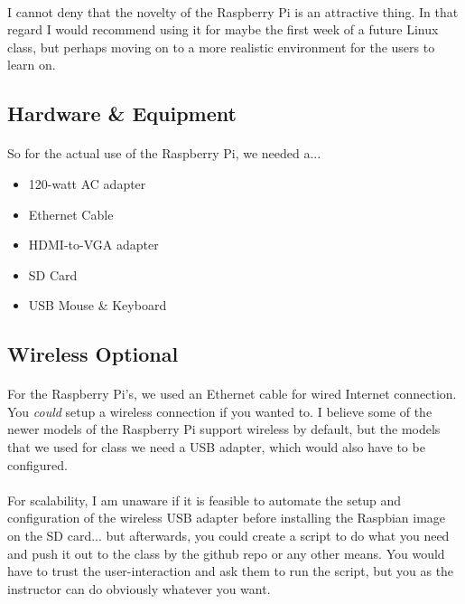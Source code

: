 \documentclass[11pt]{article}
\begin{document}
	\paragraph{} I cannot deny that the novelty of the Raspberry Pi is an attractive thing. In that regard I would recommend using it for maybe the first week of a future Linux class, but perhaps moving on to a more realistic environment for the users to learn on. 

	\subsection{Hardware \& Equipment}

	\paragraph{} So for the actual use of the Raspberry Pi, we needed a...

	\begin{itemize}
		\item 120-watt AC adapter
		\item Ethernet Cable
		\item HDMI-to-VGA adapter
		\item SD Card
		\item USB Mouse \& Keyboard
	\end{itemize}

	\subsection{Wireless Optional}

	\paragraph{} For the Raspberry Pi's, we used an Ethernet cable for wired Internet connection. You \textit{could} setup a wireless connection if you wanted to. I believe some of the newer models of the Raspberry Pi support wireless by default, but the models that we used for class we need a USB adapter, which would also have to be configured.

	\paragraph{} For scalability, I am unaware if it is feasible to automate the setup and configuration of the wireless USB adapter before installing the Raspbian image on the SD card... but afterwards, you could create a script to do what you need and push it out to the class by the github repo or any other means. You would have to trust the user-interaction and ask them to run the script, but you as the instructor can do obviously whatever you want. 
\end{document}
